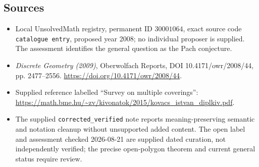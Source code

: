 \documentclass[11pt]{article}
\begin{document}
\subsection{Sources}
\begin{itemize}
\item Local UnsolvedMath registry, permanent ID \(30001064\), exact source code \texttt{catalogue entry}, proposed year 2008; no individual proposer is supplied. The assessment identifies the general question as the Pach conjecture.
\item \emph{Discrete Geometry (2009)}, Oberwolfach Reports, DOI 10.4171/owr/2008/44, pp. 2477--2556. \url{https://doi.org/10.4171/owr/2008/44}.
\item Supplied reference labelled ``Survey on multiple coverings'': \url{https://math.bme.hu/~zv/kivonatok/2015/kovacs_istvan_diplkiv.pdf}.
\item The supplied \texttt{corrected\_verified} note reports meaning-preserving semantic and notation cleanup without unsupported added content. The open label and assessment checked 2026-08-21 are supplied dated curation, not independently verified; the precise open-polygon theorem and current general status require review.
\end{itemize}
\end{document}
